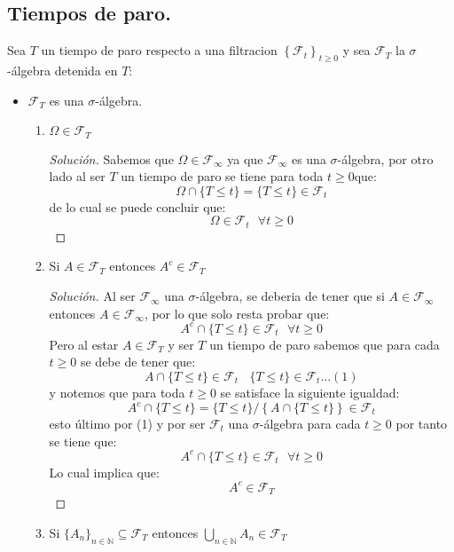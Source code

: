 \documentclass[11pt,notitlepage]{article}
\newenvironment{solucion}
  {\begin{proof}[Solución]}
  {\end{proof}}
\begin{document}
\subsection{Tiempos de paro.} Sea \(T\) un tiempo de paro respecto a una filtracion \(\left \{ \mathcal{F}_{t} \right \}_{t\geq 0}\) y sea \( \mathcal{F}_{T}\) la \(\sigma\)-álgebra detenida en \(T\): 
\begin{itemize}
    \item \(\mathcal{F}_{T}\) es una \(\sigma\)-álgebra.
    \begin{enumerate}
        \item \(\Omega \in \mathcal{F}_{T}\)
             \begin{solucion}
             Sabemos que \(\Omega \in \mathcal{F}_{\infty}\) ya que \(\mathcal{F}_{\infty}\) es una \(\sigma\)-álgebra, por otro lado al ser \(T\) un tiempo de paro se tiene para toda \(t\geq 0\)que:
             \[\Omega\cap\{T \leq t\} = \{T \leq t\}\in \mathcal{F}_t\]
             de lo cual se puede concluir que: 
             \[\Omega \in \mathcal{F}_t \ \ \ \forall t \geq 0\]
             \end{solucion}
         \item Si \(A \in \mathcal{F}_{T}\) entonces \(A^c \in \mathcal{F}_{T}\)
             \begin{solucion}
             Al ser \(\mathcal{F}_{\infty}\) una \(\sigma\)-álgebra, se deberia de tener que si \(A \in \mathcal{F}_{\infty}\) entonces \(A \in \mathcal{F}_{\infty}\), por lo que solo resta probar que: 
             \[A^c\cap\{T \leq t\} \in \mathcal{F}_t \ \ \ \forall t \geq 0\]
             Pero al estar \(A \in \mathcal{F}_T\) y ser \(T\) un tiempo de paro sabemos que para cada \(t \geq 0 \) se debe de tener que: 
             \[A\cap\{T \leq t\} \in \mathcal{F}_{t}\ \ \ \ \{T \leq t\} \in \mathcal{F}_{t}...(1)\]
             y notemos que para toda \(t \geq 0\) se satisface la siguiente igualdad:
             \[A^c\cap\{T \leq t\} = \{T \leq t\}/ \left \{ A\cap\{T \leq t\} \right \} \in \mathcal{F}_{t}\]
             esto último por (1) y por ser \(\mathcal{F}_{t}\) una \(\sigma\)-álgebra para cada \(t \geq 0\)
             por tanto se tiene que: 
             \[A^c\cap\{T \leq t\} \in \mathcal{F}_{t} \ \ \ \forall t \geq 0\]
             Lo cual implica que: 
             \[A^c \in \mathcal{F}_{T}\]
             \end{solucion}
         \item Si \(\{A_n\}_{n \in \mathbb{N}} \subseteq  \mathcal{F}_{T}\) entonces \(\bigcup_{n \in \mathbb{N}}A_n \in \mathcal{F}_{T}\)

\end{enumerate}
\end{itemize}
\end{document}
